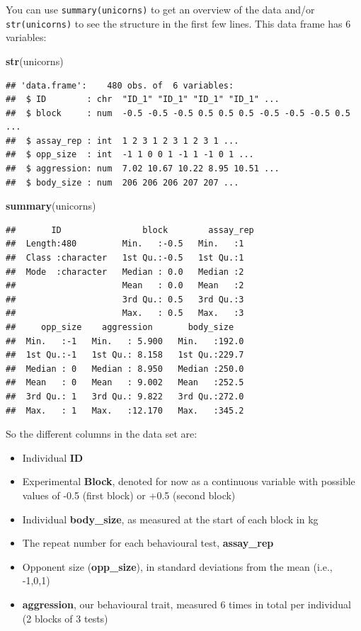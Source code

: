 \documentclass[
  12pt,
]{book}
\newenvironment{Shaded}{\begin{snugshade}}{\end{snugshade}}
\newcommand{\KeywordTok}[1]{\textcolor[rgb]{0.13,0.29,0.53}{\textbf{#1}}}
\newcommand{\NormalTok}[1]{#1}
\providecommand{\tightlist}{%
  \setlength{\itemsep}{0pt}\setlength{\parskip}{0pt}}
\begin{document}
You can use \texttt{summary(unicorns)} to get an overview of the data and/or \texttt{str(unicorns)} to see the structure in the first few lines. This data frame has 6 variables:

\begin{Shaded}
\begin{Highlighting}[]
\KeywordTok{str}\NormalTok{(unicorns)}
\end{Highlighting}
\end{Shaded}

\begin{verbatim}
## 'data.frame':    480 obs. of  6 variables:
##  $ ID        : chr  "ID_1" "ID_1" "ID_1" "ID_1" ...
##  $ block     : num  -0.5 -0.5 -0.5 0.5 0.5 0.5 -0.5 -0.5 -0.5 0.5 ...
##  $ assay_rep : int  1 2 3 1 2 3 1 2 3 1 ...
##  $ opp_size  : int  -1 1 0 0 1 -1 1 -1 0 1 ...
##  $ aggression: num  7.02 10.67 10.22 8.95 10.51 ...
##  $ body_size : num  206 206 206 207 207 ...
\end{verbatim}

\begin{Shaded}
\begin{Highlighting}[]
\KeywordTok{summary}\NormalTok{(unicorns)}
\end{Highlighting}
\end{Shaded}

\begin{verbatim}
##       ID                block        assay_rep
##  Length:480         Min.   :-0.5   Min.   :1  
##  Class :character   1st Qu.:-0.5   1st Qu.:1  
##  Mode  :character   Median : 0.0   Median :2  
##                     Mean   : 0.0   Mean   :2  
##                     3rd Qu.: 0.5   3rd Qu.:3  
##                     Max.   : 0.5   Max.   :3  
##     opp_size    aggression       body_size    
##  Min.   :-1   Min.   : 5.900   Min.   :192.0  
##  1st Qu.:-1   1st Qu.: 8.158   1st Qu.:229.7  
##  Median : 0   Median : 8.950   Median :250.0  
##  Mean   : 0   Mean   : 9.002   Mean   :252.5  
##  3rd Qu.: 1   3rd Qu.: 9.822   3rd Qu.:272.0  
##  Max.   : 1   Max.   :12.170   Max.   :345.2
\end{verbatim}

So the different columns in the data set are:

\begin{itemize}
\tightlist
\item
  Individual \textbf{ID}
\item
  Experimental \textbf{Block}, denoted for now as a continuous variable with possible values of -0.5 (first block) or +0.5 (second block)
\item
  Individual \textbf{body\_size}, as measured at the start of each block in kg
\item
  The repeat number for each behavioural test, \textbf{assay\_rep}
\item
  Opponent size (\textbf{opp\_size}), in standard deviations from the mean (i.e., -1,0,1)
\item
  \textbf{aggression}, our behavioural trait, measured 6 times in total per individual (2 blocks of 3 tests)
\end{itemize}
\end{document}
